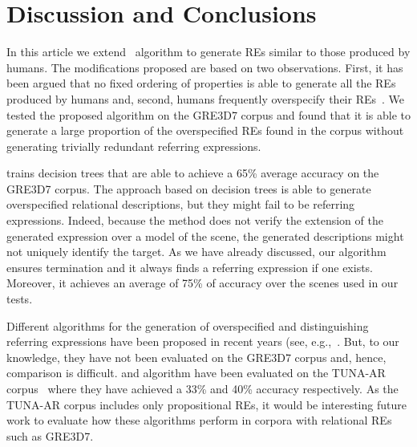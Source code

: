 \section{Discussion and Conclusions} \label{sec:discussion}

In this article we extend~ algorithm to generate REs similar to those produced by humans. The modifications 
proposed are based on two observations. First, it has been argued that no fixed ordering of properties is able to generate all the REs produced by humans and, second, humans frequently overspecify their REs~\cite{Engelhardt_Bailey_Ferreira_2006,Arts_Maes_Noordman_Jansen_2011,viet:gene11}. We tested 
the proposed algorithm on the GRE3D7 corpus and found that it is able to generate a large proportion of the overspecified REs found in the corpus without generating trivially redundant referring expressions.

 trains decision trees that are able to achieve a 65\% average accuracy on the GRE3D7 corpus. 
The approach based on decision trees is able to generate overspecified relational descriptions, but they might fail to be referring 
expressions. Indeed, because the  method does not verify the extension of the generated expression over a model of the scene, the 
generated descriptions might not uniquely identify the target.  As we have already discussed,
our algorithm ensures termination and it always finds a referring expression if one exists.  Moreover, it achieves an average of 75\% of accuracy over the scenes used in our tests. 

Different algorithms for the generation of overspecified and distinguishing referring expressions have been proposed in recent years 
(see, e.g.,~\cite{delucena-paraboni:2008:ENLG,ruud-emiel-mariet:2012:INLG2012}.  But, to our knowledge, they have not been evaluated on the 
GRE3D7 corpus and, hence, comparison is difficult.  and  algorithm
have been evaluated on the TUNA-AR corpus~\cite{gatt-balz-kow:2008:ENLG} where they have achieved a 33\% and 40\% accuracy respectively. 
As the TUNA-AR corpus includes only propositional REs, it would be interesting future work to evaluate how these algorithms perform in corpora with relational REs such as GRE3D7. 

